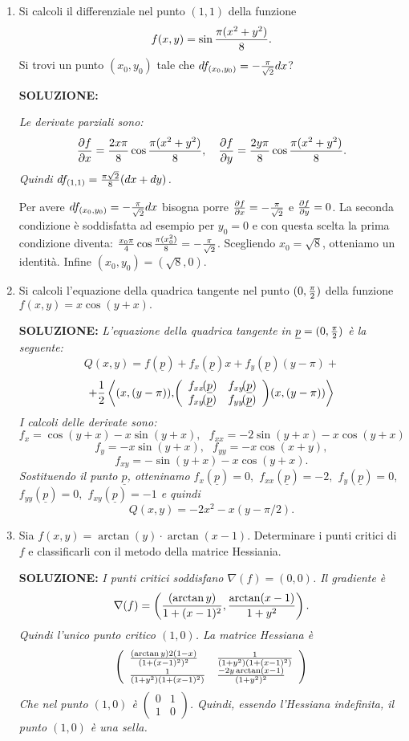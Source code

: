 \documentclass[12pt,a4paper]{report}\pagenumbering{roman}
\begin{document}
\begin{enumerate}
\item Si calcoli il differenziale nel punto $(1,1)$ della funzione 
$$f(x,y)=\sin{\pi(x^2+y^2)\over8}.$$
Si trovi un punto $(x_0,y_0)$ tale che $df_{(x_0,y_0)}=-{\pi\over\sqrt{2}}dx$?

{\bf SOLUZIONE:} {\it Le derivate parziali sono:
$${\partial f\over\partial x}={2x\pi\over8}\cos{\pi(x^2+y^2)\over8},\ \ \ 
{\partial f\over\partial y}={2y\pi\over8}\cos{\pi(x^2+y^2)\over8}.$$
Quindi $df_{(1,1)}={\pi\sqrt{2}\over8}(dx+dy)$.

Per avere $df_{(x_0,y_0)}=-{\pi\over\sqrt{2}}dx$ bisogna porre ${\partial f\over\partial x}=-{\pi\over\sqrt{2}}$ e 
${\partial f\over\partial y}=0$. La seconda condizione \`e soddisfatta
ad esempio per $y_0=0$ e con questa scelta la prima condizione diventa:
${x_0\pi\over4}\cos{\pi(x_0^2)\over8}=-{\pi\over\sqrt{2}}$. Scegliendo $x_0=\sqrt{8}$, otteniamo un 
identit\`a. Infine $(x_0,y_0)=(\sqrt{8},0)$.}

\item Si calcoli l'equazione della quadrica tangente nel punto $(0,{\pi\over2})$
della funzione $f(x,y)=x\cos(y+x).$ 

{\bf SOLUZIONE:} {\it L'equazione della quadrica tangente in $\underline{p}=(0,{\pi\over2})$ \`e la se\-guen\-te:
$$Q(x,y)=
f(\underline{p})+f_x(\underline{p})x+f_y(\underline{p})(y-\pi)+$$
$$+{1\over2}\left\langle(x,(y-\pi)),\!\left(
\begin{array}{ll}
f_{xx}\!(\underline{p}) & f_{xy}\!(\underline{p}) \\
f_{xy}\!(\underline{p}) & f_{yy}\!(\underline{p})
\end{array}
\right)\!(x,(y-\pi))\right\rangle$$
I calcoli delle derivate sono:
$$f_x=\cos(y+x)-x\sin(y+x),\ \ \ f_{xx}=-2\sin(y+x)-x\cos(y+x)$$
$$f_y=-x\sin(y+x),\ \ \ f_{yy}=-x\cos(x+y),$$
$$f_{xy}=-\sin(y+x)-x\cos(y+x).$$
Sostituendo il punto $\underline{p}$, otteninamo
$f_x(\underline{p})=0,$ $f_{xx}(\underline{p})=-2,$ $f_y(\underline{p})=0,$ $f_{yy}(\underline{p})=0,$
$f_{xy}(\underline{p})=-1$ e quindi
$$Q(x,y)=-2x^2-x(y-\pi/2).$$}

\item Sia $f(x,y)=\arctan(y)\cdot\arctan(x-1)$. Determinare i punti critici di 
$f$ e classificarli con il metodo della matrice Hessiania.

{\bf SOLUZIONE:} {\it I punti critici soddisfano $\nabla(f)=(0,0)$. Il gradiente \`e 
$$\nabla(f)=\left({(\arctan y)\over 1+(x-1)^2},{\arctan(x-1)\over 1+y^2}\right).$$
Quindi l'unico punto critico  $(1,0)$. La matrice Hessiana \`e
$$\left(\begin{array}{ll}
{(\arctan y)2(1-x)\over (1+(x-1)^2)^2} &  {1\over (1+y^2)(1+(x-1)^2)}\\
{1\over (1+y^2)(1+(x-1)^2)} & {-2y\arctan(x-1)\over (1+y^2)^2}
\end{array}\right)
$$
Che nel punto $(1,0)$ \`e $\left(\begin{array}{ll}
0 & 1 \\
1 & 0
\end{array}\right)$. Quindi, essendo l'Hessiana indefinita,  il punto $(1,0)$ \`e una sella.}


\end{enumerate}
\end{document}
